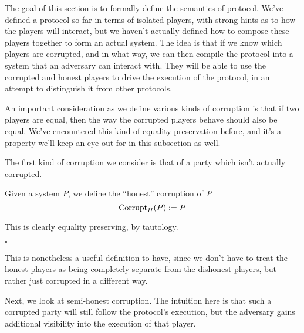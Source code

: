 The goal of this section is to formally define the semantics
of protocol.
We've defined a protocol so far in terms of isolated players,
with strong hints as to how the players will interact,
but we haven't actually defined how to compose these players
together to form an actual system.
The idea is that if we know which players are corrupted,
and in what way, we can then compile the protocol
into a system that an adversary can interact with.
They will be able to use the corrupted and honest
players to drive the execution of the protocol,
in an attempt to distinguish it from other protocols.

An important consideration as we define various kinds of corruption
is that if two players are equal, then the way the corrupted
players behave should also be equal.
We've encountered this kind of equality preservation before,
and it's a property we'll keep an eye out for in this subsection as well.

The first kind of corruption we consider is that of a party which
isn't actually corrupted.

\begin{definition}
Given a system $P$,
we define the ``honest'' corruption of $P$
$$
\text{Corrupt}_H(P) := P
$$

This is clearly equality preserving, by tautology.

$\square$
\end{definition}

This is nonetheless a useful definition to have, since we don't
have to treat the honest players as being completely separate
from the dishonest players, but rather just corrupted in a different way.

Next, we look at semi-honest corruption.
The intuition here is that such a corrupted party will still
follow the protocol's execution, but the adversary 
gains additional visibility into the execution of that player.

